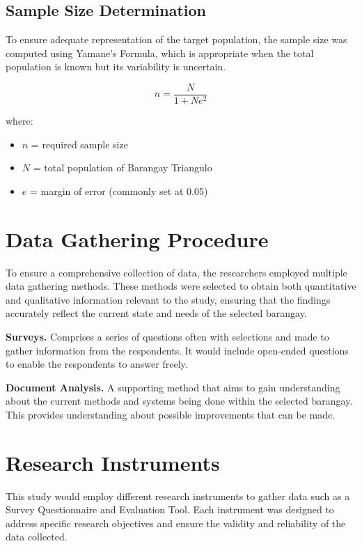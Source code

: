 \documentclass{research}
\begin{document}
\subsection*{Sample Size Determination}

To ensure adequate representation of the target population, the sample size was computed using Yamane's Formula, which is appropriate when the total population is known but its variability is uncertain.

\begin{equation}
    n = \frac{N}{1 + Ne^{2}}
\end{equation}

\noindent where:
\begin{itemize}
    \item $n$ = required sample size
    \item $N$ = total population of Barangay Triangulo
    \item $e$ = margin of error (commonly set at 0.05)
\end{itemize}

\section{Data Gathering Procedure}

To ensure a comprehensive collection of data, the researchers employed multiple data gathering methods. These methods were selected to obtain both quantitative and qualitative information relevant to the study, ensuring that the findings accurately reflect the current state and needs of the selected barangay.

\textbf{Surveys.} Comprises a series of questions often with selections and made to gather information from the respondents. It would include open-ended questions to enable the respondents to answer freely.

\textbf{Document Analysis.} A supporting method that aims to gain understanding about the current methods and systems being done within the selected barangay. This provides understanding about possible improvements that can be made.

\section{Research Instruments}

This study would employ different research instruments to gather data such as a Survey Questionnaire and Evaluation Tool. Each instrument was designed to address specific research objectives and ensure the validity and reliability of the data collected.
\end{document}

